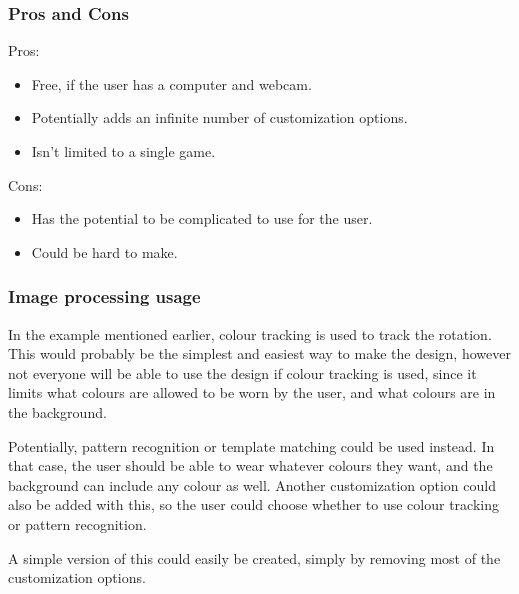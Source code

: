 \pagebreak[4]
\subsubsection*{Pros and Cons}
Pros:
\begin{itemize}
\item Free, if the user has a computer and webcam.
\item Potentially adds an infinite number of customization options.
\item Isn’t limited to a single game.
\end{itemize}
Cons:
\begin{itemize}
\item Has the potential to be complicated to use for the user.
\item Could be hard to make.
\end{itemize}

\subsubsection*{Image processing usage}
In the example mentioned earlier, colour tracking is used to track the rotation. This would probably be the simplest and easiest way to make the design, however not everyone will be able to use the design if colour tracking is used, since it limits what colours are allowed to be worn by the user, and what colours are in the background.

Potentially, pattern recognition or template matching could be used instead. In that case, the user should be able to wear whatever colours they want, and the background can include any colour as well. Another customization option could also be added with this, so the user could choose whether to use colour tracking or pattern recognition.

A simple version of this could easily be created, simply by removing most of the customization options.
